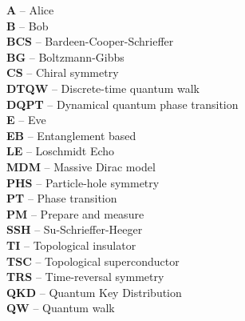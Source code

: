 \textbf{A} -- Alice
\vspace{0.5cm}\\
\textbf{B} -- Bob
\vspace{0.5cm}\\
\textbf{BCS} -- Bardeen-Cooper-Schrieffer
\vspace{0.5cm}\\
\textbf{BG} -- Boltzmann-Gibbs
\vspace{0.5cm}\\
\textbf{CS} -- Chiral symmetry
\vspace{0.5cm}\\
\textbf{DTQW} -- Discrete-time quantum walk 
\vspace{0.5cm}\\
\textbf{DQPT} -- Dynamical quantum phase transition 
\vspace{0.5cm}\\
\textbf{E} -- Eve
\vspace{0.5cm}\\
\textbf{EB} -- Entanglement based
\vspace{0.5cm}\\
\textbf{LE} -- Loschmidt Echo
\vspace{0.5cm}\\
\textbf{MDM} -- Massive Dirac model
\vspace{0.5cm}\\
\textbf{PHS} -- Particle-hole symmetry
\vspace{0.5cm}\\
\textbf{PT} -- Phase transition
\vspace{0.5cm}\\
\textbf{PM} -- Prepare and measure
\vspace{0.5cm}\\
\textbf{SSH} -- Su-Schrieffer-Heeger
\vspace{0.5cm}\\
\textbf{TI} -- Topological insulator
\vspace{0.5cm}\\
\textbf{TSC} -- Topological superconductor
\vspace{0.5cm}\\
\textbf{TRS} -- Time-reversal symmetry
\vspace{0.5cm}\\
\textbf{QKD} -- Quantum Key Distribution
\vspace{0.5cm}\\
\textbf{QW} -- Quantum walk
\vspace{0.5cm}\\
